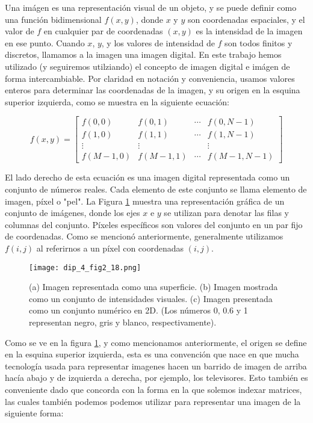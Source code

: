 Una im\'agen es una representaci\'on visual de un objeto, y se puede definir como una funci\'on bidimensional $f(x,y)$, donde $x$ y $y$ son coordenadas espaciales, y el valor de $f$ en cualquier par de coordenadas $(x,y)$ es la intensidad de la imagen en ese punto. Cuando $x$, $y$, y los valores de intensidad de $f$ son todos finitos y discretos, llamamos a la imagen una imagen digital. En este trabajo hemos utilizado (y seguiremos utilziando) el concepto de imagen digital e im\'agen de forma intercambiable. Por claridad en notaci\'on y conveniencia, usamos valores enteros para determinar las coordenadas de la imagen, y su origen en la esquina superior izquierda, como se muestra en la siguiente ecuaci\'on:

$$
f(x, y)=\left[\begin{array}{cccc}
f(0,0) & f(0,1) & \cdots & f(0, N-1) \\
f(1,0) & f(1,1) & \cdots & f(1, N-1) \\
\vdots & \vdots & & \vdots \\
f(M-1,0) & f(M-1,1) & \cdots & f(M-1, N-1)
\end{array}\right]
$$

El lado derecho de esta ecuación es una imagen digital representada como un conjunto de números reales. Cada elemento de este conjunto se llama elemento de imagen, píxel o "pel". La Figura \ref{fig:dip_2_18} muestra una representación gráfica de un conjunto de imágenes, donde los ejes $x$ e $y$ se utilizan para denotar las filas y columnas del conjunto. Píxeles específicos son valores del conjunto en un par fijo de coordenadas. Como se mencionó anteriormente, generalmente utilizamos $f(i, j)$ al referirnos a un píxel con coordenadas $(i, j)$.


\begin{figure}[H]
    \centering
    \texttt{[image: dip\_4\_fig2\_18.png]}
    \caption{
        (a) Imagen representada como una superficie.
        (b) Imagen mostrada como un conjunto de intensidades visuales.
        (c) Imagen presentada como un conjunto numérico en 2D. (Los números 0, 0.6 y 1 representan negro, gris y blanco, respectivamente).}
    \label{fig:dip_2_18}
\end{figure}

Como se ve en la figura \ref{fig:dip_2_18}, y como mencionamos anteriormente, el origen se define en la esquina superior izquierda, esta es una convenci\'on que nace en que mucha tecnolog\'ia usada para representar imagenes hacen un barrido de imagen de arriba hacía abajo y de izquierda a derecha, por ejemplo, los televisores. Esto tambi\'en es conveniente dado que concorda con la forma en la que solemos indexar matrices, las cuales tambi\'en podemos podemos utilizar para representar una imagen  de la siguiente forma:

